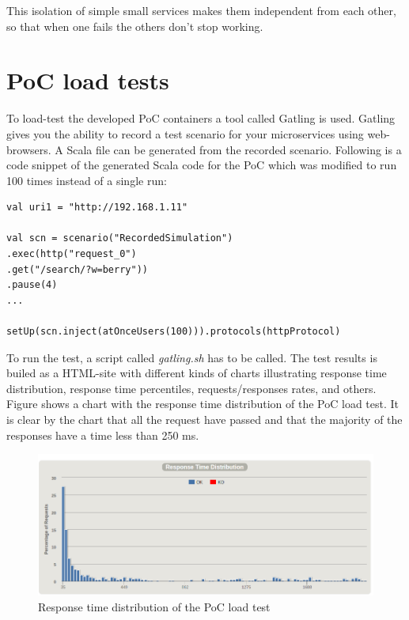 This isolation of simple small services makes them independent from each other, so that when one fails the others don’t stop working.   

\section{PoC load tests}
To load-test the developed PoC containers a tool called Gatling is used. Gatling gives you the ability to record a test scenario for your microservices using web-browsers. A Scala file can be generated from the recorded scenario. Following is a code snippet of the generated Scala code for the PoC which was modified to run 100 times instead of a single run: \begin{lstlisting}[frame=single, ]
val uri1 = "http://192.168.1.11"

val scn = scenario("RecordedSimulation")
.exec(http("request_0")
.get("/search/?w=berry"))
.pause(4)
...

setUp(scn.inject(atOnceUsers(100))).protocols(httpProtocol)
\end{lstlisting}

To run the test, a script called \textit{gatling.sh} has to be called. The test results is builed as a HTML-site with different kinds of charts illustrating response time distribution, response time percentiles, requests/responses rates, and others. Figure \label{fig:responseTimeDistribution} shows a chart with the response time distribution of the PoC load test. It is clear by the chart that all the request have passed and that the majority of the responses have a time less than 250 ms.

\begin{figure}[bth]
	\centering 
	\includegraphics[width=1\linewidth]{gfx/responseTimeDistribution}
	\caption[responseTimeDistribution]{Response time distribution of the PoC load test} \label{fig:responseTimeDistribution}
\end{figure}